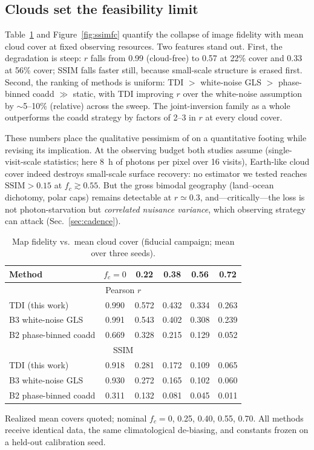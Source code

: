 ﻿\documentclass[twocolumn,10pt]{article}
\begin{document}
\subsection{Clouds set the feasibility limit}
\label{sec:clouds}
Table~\ref{tab:clouds} and Figure~\ref{fig:ssimfc} quantify the collapse
of image fidelity with mean cloud cover at fixed observing resources.
Two features stand out. First, the degradation is steep: $r$ falls from
0.99 (cloud-free) to 0.57 at 22\% cover and 0.33 at 56\% cover; SSIM
falls faster still, because small-scale structure is erased first.
Second, the ranking of methods is uniform: TDI $>$ white-noise GLS $>$
phase-binned coadd $\gg$ static, with TDI improving $r$ over the
white-noise assumption by $\sim$5--10\% (relative) across the sweep.
The joint-inversion family as a whole outperforms the coadd strategy by
factors of 2--3 in $r$ at every cloud cover.

These numbers place the qualitative pessimism of \citet{toth25clouds} on
a quantitative footing while revising its implication. At the observing
budget both studies assume (single-visit-scale statistics; here 8~h of
photons per pixel over 16 visits), Earth-like cloud cover indeed
destroys small-scale surface recovery: no estimator we tested reaches
$\mathrm{SSIM}>0.15$ at $f_c\gtrsim0.55$. But the gross bimodal
geography (land--ocean dichotomy, polar caps) remains detectable at
$r\simeq0.3$, and---critically---the loss is not photon-starvation but
{\it correlated nuisance variance}, which observing strategy can attack
(Sec.~\ref{sec:cadence}).

\begin{table}[t]
\centering
\caption{Map fidelity vs.\ mean cloud cover (fiducial campaign;
mean over three seeds).}
\label{tab:clouds}
\small
\begin{tabular}{lccccc}
\toprule
Method & $f_c{=}0$ & 0.22 & 0.38 & 0.56 & 0.72\\
\midrule
\multicolumn{6}{c}{Pearson $r$}\\
TDI (this work)        & 0.990 & 0.572 & 0.432 & 0.334 & 0.263 \\
B3 white-noise GLS     & 0.991 & 0.543 & 0.402 & 0.308 & 0.239 \\
B2 phase-binned coadd  & 0.669 & 0.328 & 0.215 & 0.129 & 0.052 \\
\midrule
\multicolumn{6}{c}{SSIM}\\
TDI (this work)        & 0.918 & 0.281 & 0.172 & 0.109 & 0.065 \\
B3 white-noise GLS     & 0.930 & 0.272 & 0.165 & 0.102 & 0.060 \\
B2 phase-binned coadd  & 0.311 & 0.132 & 0.081 & 0.045 & 0.011 \\
\bottomrule
\end{tabular}

\vspace{1mm}
\parbox{0.97\columnwidth}{\footnotesize Realized mean covers quoted;
nominal $f_c=0$, 0.25, 0.40, 0.55, 0.70. All methods receive identical
data, the same climatological de-biasing, and constants frozen on a
held-out calibration seed.}
\end{table}
\end{document}
